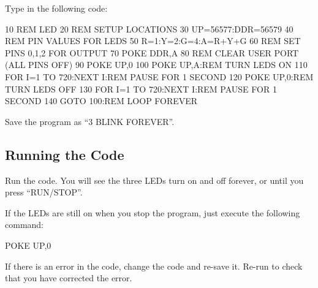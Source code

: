 Type in the following code:
\begin{basic}
10 REM LED
20 REM SETUP LOCATIONS
30 UP=56577:DDR=56579
40 REM PIN VALUES FOR LEDS
50 R=1:Y=2:G=4:A=R+Y+G
60 REM SET PINS 0,1,2 FOR OUTPUT
70 POKE DDR,A
80 REM CLEAR USER PORT (ALL PINS OFF)
90 POKE UP,0
100 POKE UP,A:REM TURN LEDS ON
110 FOR I=1 TO 720:NEXT I:REM PAUSE FOR 1 SECOND
120 POKE UP,0:REM TURN LEDS OFF
130 FOR I=1 TO 720:NEXT I:REM PAUSE FOR 1 SECOND
140 GOTO 100:REM LOOP FOREVER
\end{basic}

Save the program as ``3 BLINK FOREVER''.

\subsection*{Running the Code}

Run the code.  You will see the three LEDs turn on and off forever, or until you press ``RUN/STOP''.

If the LEDs are still on when you stop the program, just execute the following command:
\begin{basic}
POKE UP,0
\end{basic}

If there is an error in the code, change the code and re-save it.  Re-run to check that you have corrected the error.

